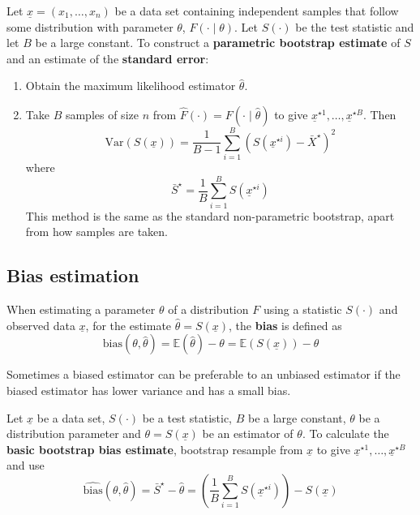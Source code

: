 \begin{definition}
	Let $\underline{x} = (x_1, \dots, x_n)$ be a data set containing independent samples that follow some distribution with parameter $\theta$, $F(\cdot \mid \theta)$. Let $S(\cdot)$ be the test statistic and let $B$ be a large constant. To construct a \textbf{parametric bootstrap estimate} of $S$ and an estimate of the \textbf{standard error}:

	\begin{enumerate}
		\item Obtain the maximum likelihood estimator $\hat{\theta}$.
		\item Take $B$ samples of size $n$ from $\hat{F}(\cdot) = F(\cdot \mid \hat{\theta})$ to give $\underline{x}^{\star 1}, \dots, \underline{x}^{\star B}$. Then
		\[
			\widehat{\text{Var}}(S(\underline{x})) = \frac{1}{B - 1} \sum_{i = 1}^{B} {\left( S \left( \underline{x}^{\star i} \right) - \bar{X}^{\star} \right)}^2
		\]
		where
		\[
			\bar{S}^{\star} = \frac{1}{B} \sum_{i = 1}^{B} S \left( \underline{x}^{\star i} \right)
		\]
		This method is the same as the standard non-parametric bootstrap, apart from how samples are taken.
	\end{enumerate}
\end{definition}

\subsection{Bias estimation}

\begin{definition}
	When estimating a parameter $\theta$ of a distribution $F$ using a statistic $S(\cdot)$ and observed data $\underline{x}$, for the estimate $\hat{\theta} = S(\underline{x})$, the \textbf{bias} is defined as
	\[
		\text{bias}(\theta, \hat{\theta}) = \mathbb{E}(\hat{\theta}) - \theta = \mathbb{E}(S(\underline{x})) - \theta
	\]
\end{definition}

\begin{remark}
	Sometimes a biased estimator can be preferable to an unbiased estimator if the biased estimator has lower variance and has a small bias.
\end{remark}

\begin{definition}
	Let $\underline{x}$ be a data set, $S(\cdot)$ be a test statistic, $B$ be a large constant, $\theta$ be a distribution parameter and $\theta = S(\underline{x})$ be an estimator of $\theta$. To calculate the \textbf{basic bootstrap bias estimate}, bootstrap resample from $\underline{x}$ to give $\underline{x}^{\star 1}, \dots, \underline{x}^{\star B}$ and use
	\[
		\widehat{\text{bias}}(\theta, \hat{\theta}) = \bar{S}^{\star} - \hat{\theta} = \left( \frac{1}{B} \sum_{i = 1}^{B} S \left( \underline{x}^{\star i} \right) \right) - S(\underline{x})
	\]
\end{definition}

